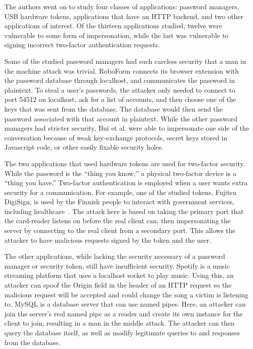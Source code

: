 The authors went on to study four classes of applications: password managers, USB hardware tokens, applications that have an HTTP backend, and two other applications of interest.  Of the thirteen applications studied, twelve were vulnerable to some form of impersonation, while the last was vulnerable to signing incorrect two-factor authentication requests.

Some of the studied password managers had such careless security that a man in the machine attack was trivial.  RoboForm connects its browser extension with the password database through localhost, and communicates the password in plaintext.  To steal a user's passwords, the attacker only needed to connect to port 54512 on localhost, ask for a list of accounts, and then choose one of the keys that was sent from the database.  The database would then send the password associated with that account in plaintext.  While the other password managers had stricter security, Bui et al. were able to impersonate one side of the conversation because of weak key-exchange protocols, secret keys stored in Javascript code, or other easily fixable security holes.

The two applications that used hardware tokens are used for two-factor security.  While the password is the ``thing you know,'' a physical two-factor device is a ``thing you have.''  Two-factor authentication is employed when a user wants extra security for a communication.  For example, one of the studied tokens, Fujitsu DigiSign, is used by the Finnish people to interact with government services, including healthcare~\cite{MitMa}.  The attack here is based on taking the primary port that the card-reader listens on before the real client can, then impersonating the server by connecting to the real client from a secondary port.  This allows the attacker to have malicious requests signed by the token and the user.

The other applications, while lacking the security necessary of a password manager or security token, still have insufficient security.  Spotify is a music streaming platform that uses a localhost socket to play music.  Using this, an attacker can spoof the Origin field in the header of an HTTP request so the malicious request will be accepted and could change the song a victim is listening to.  MySQL is a database server that can use named pipes.  Here, an attacker can join the server's real named pipe as a reader and create its own instance for the client to join, resulting in a man in the middle attack.  The attacker can then query the database itself, as well as modify legitimate queries to and responses from the database.

